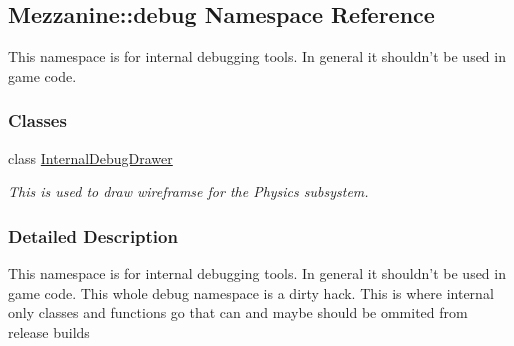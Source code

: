\hypertarget{namespaceMezzanine_1_1debug}{
\subsection{Mezzanine::debug Namespace Reference}
\label{namespaceMezzanine_1_1debug}
}


This namespace is for internal debugging tools. In general it shouldn't be used in game code.  


\subsubsection*{Classes}
\begin{DoxyCompactItemize}
\item 
class \hyperlink{classMezzanine_1_1debug_1_1InternalDebugDrawer}{InternalDebugDrawer}
\begin{DoxyCompactList}\small\item\em This is used to draw wireframse for the Physics subsystem. \item\end{DoxyCompactList}\end{DoxyCompactItemize}


\subsubsection{Detailed Description}
This namespace is for internal debugging tools. In general it shouldn't be used in game code. This whole debug namespace is a dirty hack. This is where internal only classes and functions go that can and maybe should be ommited from release builds 